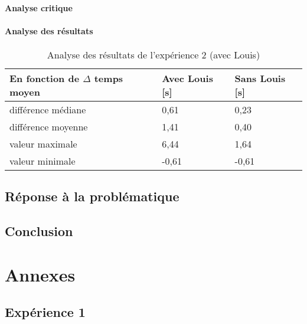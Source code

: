 \documentclass[12pt,fleqn,oneside,openany]{book} %
\begin{document}
\subsubsection{Analyse critique} \label{sssec:analyseCrit2.2}

\subsubsection{Analyse des résultats} \label{sssec:analyseResult2.2}

\begin{table}[h!]
	\centering
	\caption{Analyse des résultats de l'expérience 2 (avec Louis)} \label{tbl:analyse2.1}
	\begin{tabular}{lll}
		\toprule 
		\textbf{En fonction de $\Delta$ temps moyen} & \textbf{Avec Louis [s]} & \textbf{Sans Louis [s]} \\ \midrule
		différence médiane & 0,61 & 0,23 \\
		différence moyenne & 1,41 & 0,40 \\
		valeur maximale & 6,44 & 1,64 \\
		valeur minimale & -0,61 & -0,61 \\ \bottomrule
	\end{tabular}
\end{table}

\newpage
\section{Réponse à la problématique} \label{sec:reponseProb}

\newpage
\section{Conclusion} \label{sec:conclusion}




\appendix
\chapter{Annexes} \label{cha:annexes}
\section*{Expérience 1}
\end{document}
